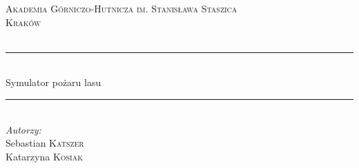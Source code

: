 \documentclass[a4paper, 11pt]{article}
\begin{document}
	
	\begin{titlepage}
		
		
		
		\newcommand{\HRule}{\rule{\linewidth}{0.5mm}} %
		
		\center %
		
		
		\textsc{\LARGE Akademia Górniczo-Hutnicza im. Stanisława Staszica}\\[1.5cm] %
		\textsc{\Large Kraków}\\[0.5cm] %
		\textsc{\large }\\[0.5cm] %
		
		
		\HRule \\[0.4cm]
		{\fontsize{38}{50}\selectfont Symulator pożaru lasu}
		\HRule \\[1.5cm]
		
		
		\Large \emph{Autorzy:}\\
		Sebastian \textsc{Katszer}\\ %
		Katarzyna \textsc{Kosiak} \\[3cm]\ %
		

\end{titlepage}
\end{document}
